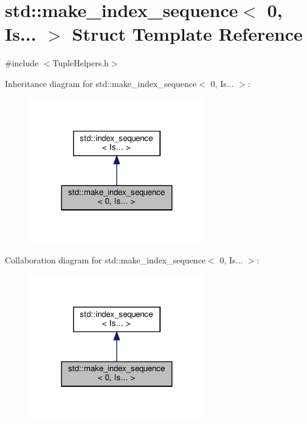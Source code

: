 \hypertarget{structstd_1_1make__index__sequence_3_010_00_01_is_8_8_8_01_4}{}\section{std\+:\+:make\+\_\+index\+\_\+sequence$<$ 0, Is... $>$ Struct Template Reference}
\label{structstd_1_1make__index__sequence_3_010_00_01_is_8_8_8_01_4}


{\ttfamily \#include $<$Tuple\+Helpers.\+h$>$}



Inheritance diagram for std\+:\+:make\+\_\+index\+\_\+sequence$<$ 0, Is... $>$\+:
\nopagebreak
\begin{figure}[H]
\begin{center}
\leavevmode
\includegraphics[width=216pt]{structstd_1_1make__index__sequence_3_010_00_01_is_8_8_8_01_4__inherit__graph}
\end{center}
\end{figure}


Collaboration diagram for std\+:\+:make\+\_\+index\+\_\+sequence$<$ 0, Is... $>$\+:
\nopagebreak
\begin{figure}[H]
\begin{center}
\leavevmode
\includegraphics[width=216pt]{structstd_1_1make__index__sequence_3_010_00_01_is_8_8_8_01_4__coll__graph}
\end{center}
\end{figure}


